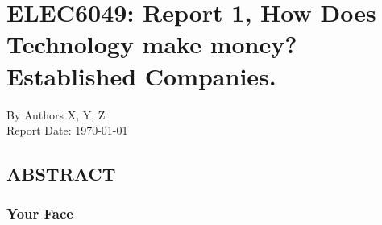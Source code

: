 \documentclass[11pt,a4paper]{article}
\newcommand{\authornames}{Authors X, Y, Z}
\newcommand{\reportname}{ELEC6049: Report 1, How Does Technology make money? Established Companies.}
\begin{document}
\section{\reportname}
\large{By \authornames}
\\
\large{Report Date: \today}
\subsection{ABSTRACT}

\subsubsection{Your Face}
\end{document}
